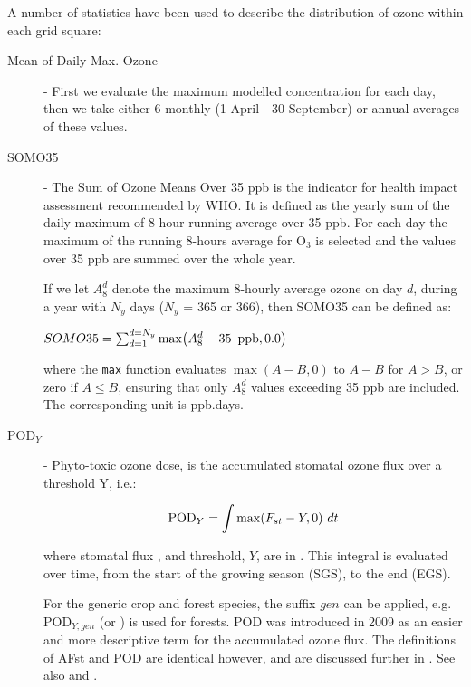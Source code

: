 \noindent

A number of statistics have been used to describe the distribution of
ozone within each grid square:\\
\begin{description}

     \item[Mean of Daily Max. Ozone] - First we evaluate the maximum
modelled concentration for each day, then we take either 6-monthly
(1 April - 30 September) or annual averages of these values.

     \item[SOMO35] - The Sum of Ozone Means Over 35 ppb is the
     indicator for health impact assessment recommended by WHO. It is
     defined as the yearly sum of the daily maximum of 8-hour running
     average over 35 ppb. For each day the maximum of the running
     8-hours average for O$_3$ is selected and the values over 35 ppb
     are summed over the whole year.

     If we let $A^d_8$ denote the
     maximum 8-hourly average ozone on day $d$, during a year with
     $N_y$ days ($N_y$ = 365 or 366), then SOMO35 can be defined as:

\begin{math}
SOMO35 = \sum_{d=1}^{d=N_y} \max\bigl(A^d_8 - 35 \mbox{\, ppb}, 0.0\bigr)
\end{math}

where the {\tt max} function evaluates $\max(A-B,0)$ to $A-B$ for $A > B$, or
zero if $A \leq B$, ensuring that only $A^d_8$ values exceeding 35
ppb are included.  The corresponding unit is ppb.days.


\item[POD$_Y$] - Phyto-toxic ozone dose, is the accumulated stomatal ozone flux over a threshold Y, i.e.:

\begin{equation}
   \mbox{POD}_{Y} = \int \max(F_{st} - Y, 0)\   dt
\end{equation}

where stomatal flux \Fst, and threshold, $Y$, are in \nmole.
This integral is evaluated over time, from the
start of the growing season (SGS), to the end (EGS).

For the generic crop and forest species, the suffix $gen$ can be
applied, e.g. POD$_{Y, gen}$ (or \AFSTDF) is used for forests.
POD was introduced in 2009 as an easier and  more descriptive term for the
accumulated ozone flux. The definitions of AFst and POD are identical
however, and are discussed further in \citet{R2010:Fluxes}. See
also \citet{MillsGCB2011,MillsAE2011} and \citet{MillsGCB2018a}.



\end{description}
